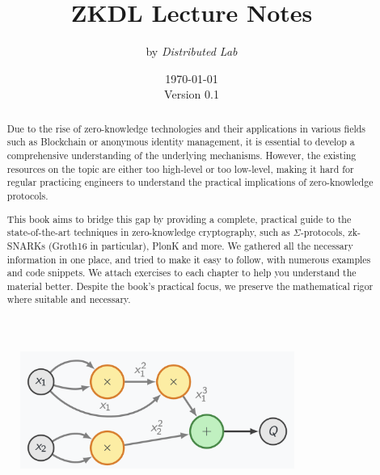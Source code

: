 \documentclass{zkdl-template}
\title{\huge\sffamily\bfseries ZKDL Lecture Notes}
\author{\Large\sffamily by \emph{Distributed Lab}}
\date{\sffamily \today \\ \vspace{1mm} Version 0.1}
\begin{document}
\pagestyle{fancy}



\pagecolor{coverBackground}
\begin{tcolorbox}[
    standard jigsaw,
    colframe=coverBoxBackground, 
    colback=oc-gray-3,
    width=\textwidth, 
    halign=center, 
    valign=center, 
    arc=1em,
    shadow={4mm}{-3mm}{0mm}{black!30!white},
    enhanced,
    boxrule=5pt,
    rightrule=9pt,
    bottomrule=9pt]
    \maketitle
\end{tcolorbox}


\vspace{1.5cm}
\begin{figure}[h]
    \centering
    \includegraphics[width=0.8\textwidth]{lectures/images/cover-image-1.png}
\end{figure}

\newpage

\pagecolor{white}

\begin{abstract}
    Due to the rise of zero-knowledge technologies and their applications in
    various fields such as Blockchain or anonymous identity management, it is
    essential to develop a comprehensive understanding of the underlying
    mechanisms. However, the existing resources on the topic are either too
    high-level or too low-level, making it hard for regular practicing engineers
    to understand the practical implications of zero-knowledge protocols.

    This book aims to bridge this gap by providing a complete, practical guide
    to the state-of-the-art techniques in zero-knowledge cryptography, such as
    $\Sigma$-protocols, zk-SNARKs (Groth16 in particular), PlonK and more. We
    gathered all the necessary information in one place, and tried to make it
    easy to follow, with numerous examples and code snippets. We attach
    exercises to each chapter to help you understand the material better.
    Despite the book's practical focus, we preserve the mathematical rigor where
    suitable and necessary.
\end{abstract}
\end{document}
